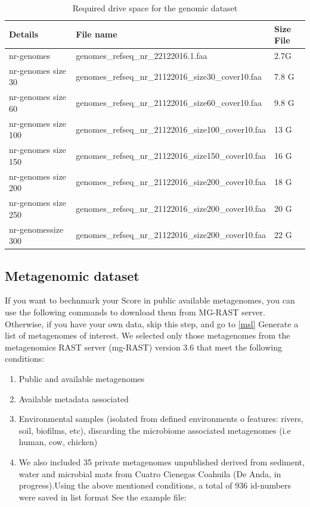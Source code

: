 \documentclass[12pt]{report}
\begin{document}
\begin{table}[H]
\centering
\caption{Required drive space for the genomic dataset}
\label{sizes}
\begin{tabular}{@{}lll@{}}
\toprule
Details             & File name                                           & Size File \\ \midrule
nr-genomes          & genomes\_refseq\_nr\_22122016.1.faa                 & 2.7G      \\
nr-genomes size 30  & genomes\_refseq\_nr\_21122016\_size30\_cover10.faa  & 7.8 G     \\
nr-genomes size 60  & genomes\_refseq\_nr\_21122016\_size60\_cover10.faa  & 9.8 G     \\
nr-genomes size 100 & genomes\_refseq\_nr\_21122016\_size100\_cover10.faa & 13 G      \\
nr-genomes size 150 & genomes\_refseq\_nr\_21122016\_size150\_cover10.faa & 16 G      \\
nr-genomes size 200 & genomes\_refseq\_nr\_21122016\_size200\_cover10.faa & 18 G      \\
nr-genomes size 250 & genomes\_refseq\_nr\_21122016\_size200\_cover10.faa & 20 G      \\
nr-genomessize 300  & genomes\_refseq\_nr\_21122016\_size200\_cover10.faa & 22 G      \\ \bottomrule
\end{tabular}
\end{table}

\subsection{Metagenomic dataset}
If you want to bechnmark your Score in public available metagenomes, you can use the following commands to download them from MG-RAST server. Otherwise, if you have your own data, skip this step, and go to \ref{msl}
Generate a list of metagenomes of interest. We selected only those metagenomes from the metagenomics RAST server (mg-RAST) version 3.6 that meet the following conditions:
\begin{enumerate}
\item Public and available metagenomes
\item Available metadata associated 
\item Environmental samples (isolated from defined environments o features: rivers, soil, biofilms, etc), discarding the microbiome associated metagenomes (i.e human, cow, chicken)
\item We also included 35 private metagenomes unpublished derived from sediment, water and microbial mats from Cuatro Cienegas Coahuila (De Anda, in progress).Using the above mentioned conditions, a total of 936 id-numbers were saved in list format
See the example file: 
\end{enumerate}
\end{document}
